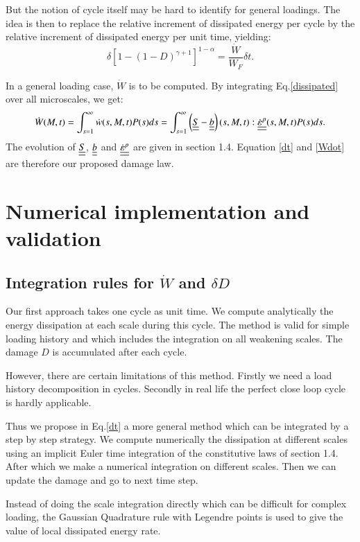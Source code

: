 \documentclass[3p,times,procedia,number]{elsarticle}
\begin{document}
But the notion of cycle itself may be hard to identify for general loadings. The idea is then to replace the relative increment of dissipated energy per cycle by the relative increment of dissipated energy per unit time, yielding:
\begin{equation}
	\delta [1-(1-D)^{\gamma+1}]^{1-\alpha}=\dfrac{\dot{W}}{W_F}\delta t.
	\label{dt}
\end{equation}

In a general loading case, $\dot{W}$ is to be computed. By integrating Eq.\eqref{dissipated} over all microscales, we get:
\begin{equation}\dot{W}(M,t)=\int_{s=1}^{\infty}\dot{w}(s,M,t)P(s)ds=\int_{s=1}^{\infty}\left(\uline{\uline{S}}-\uline{\uline{b}} \right) (s,M,t):\uline{\uline{\dot{\varepsilon}^p}}(s,M,t)P(s)ds.\label{Wdot}
\end{equation}
The evolution of $\uline{\uline{S}}$, $\uline{\uline{b}}$ and $\uline{\uline{\dot{\varepsilon}^p}}$ are given in section 1.4. Equation \eqref{dt} and \eqref{Wdot} are therefore our proposed damage law.

\section{Numerical implementation and validation}
\subsection{Integration rules for $\dot{W}$ and $\delta D$}
Our first approach takes one cycle as unit time. We compute analytically the energy dissipation at each scale during this cycle. The method is valid for simple loading history and which includes the integration on all weakening scales. The damage $D$ is accumulated after each cycle.

However, there are certain limitations of this method. Firstly we need a load history decomposition in cycles. Secondly in real life the perfect close loop cycle is hardly applicable.

Thus we propose in Eq.\eqref{dt} a more general method which can be integrated by a step by step strategy. We compute numerically the dissipation at different scales using an implicit Euler time integration of the constitutive laws of section 1.4. After which we make a numerical integration on different scales. Then we can update the damage and go to next time step. 

Instead of doing the scale integration directly which can be difficult for complex loading, the Gaussian Quadrature rule with Legendre points is used to give the value of local dissipated energy rate.
\end{document}
